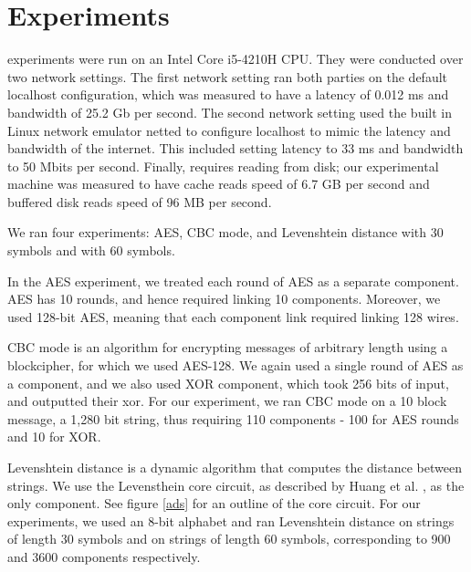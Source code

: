 \section{Experiments}
\CompGC experiments were run on an Intel Core i5-4210H CPU. 
They were conducted over two network settings. 
The first network setting ran both parties on the default localhost configuration, which was measured to have a latency of 0.012 ms and bandwidth of 25.2 Gb per second. 
The second network setting used the built in Linux network emulator {\sf netted} to configure localhost to mimic the latency and bandwidth of the internet. 
This included setting latency to 33 ms and bandwidth to 50 Mbits per second. 
Finally, \CompGC requires reading from disk; our experimental machine was measured to have cache reads speed of 6.7 GB per second and buffered disk reads speed of 96 MB per second.

We ran four experiments: AES, CBC mode, and Levenshtein distance with 30 symbols and with 60 symbols. 

In the AES experiment, we treated each round of AES as a separate component. AES has 10 rounds, and hence required linking 10 components. Moreover, we used 128-bit AES, meaning that each component link required linking 128 wires. 

CBC mode is an algorithm for encrypting messages of arbitrary length using a blockcipher, for which we used AES-128. 
We again used a single round of AES as a component, and we also used XOR component, which took 256 bits of input, and outputted their xor. 
For our experiment, we ran CBC mode on a 10 block message, a 1,280 bit string, thus requiring 110 components - 100 for AES rounds and 10 for XOR. 

Levenshtein distance is a dynamic algorithm that computes the distance between strings. 
We use the Levensthein core circuit, as described by Huang et al. \cite{asdf}, as the only component. 
See figure \ref{ads} for an outline of the core circuit. 
For our experiments, we used an 8-bit alphabet and ran Levenshtein distance on strings of length 30 symbols and on strings of length 60 symbols, corresponding to 900 and 3600 components respectively. 

